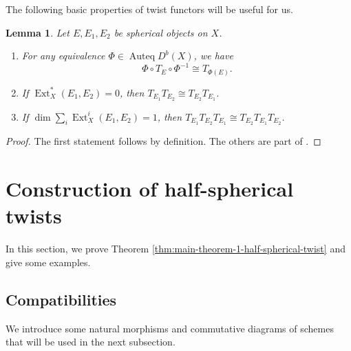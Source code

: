 \documentclass{amsart}
\numberwithin{equation}{section}
\theoremstyle{plain}
\newtheorem{lemma}[theorem]{Lemma}
\theoremstyle{definition}
\DeclareMathOperator{\Auteq}{\mathrm{Auteq}}
\DeclareMathOperator{\Ext}{\mathrm{Ext}}
\begin{document}
The following basic properties of twist functors will be useful for us.
\begin{lemma}
    Let $E, E_1, E_2$ be spherical objects on $X$.
    \begin{enumerate}
        \item For any equivalence $\Phi \in \Auteq{D^b(X)}$, we have \begin{equation}
                  \Phi \circ T_E \circ \Phi^{-1} \cong T_{\Phi(E)}.
              \end{equation}
        \item If $\Ext^*_X(E_1, E_2) = 0$, then $T_{E_1}T_{E_2} \cong T_{E_2}T_{E_1}$.
        \item If $\dim \sum_i \Ext_X^i(E_1, E_2) = 1$, then $T_{E_1}T_{E_2} T_{E_1} \cong T_{E_2}T_{E_1}T_{E_2}$.
    \end{enumerate}
\end{lemma}
\begin{proof}
    The first statement follows by definition.
    The others are part of \cite[Theorem 1.2]{MR1831820}.
\end{proof}





\section{Construction of half-spherical twists}\label{section:construction-of-half-spherical-twists}
In this section, we prove Theorem \ref{thm:main-theorem-1-half-spherical-twist} and give some examples.
\subsection{Compatibilities}
We introduce some natural morphisms and commutative diagrams of schemes that will be used in the next subsection.
\end{document}
